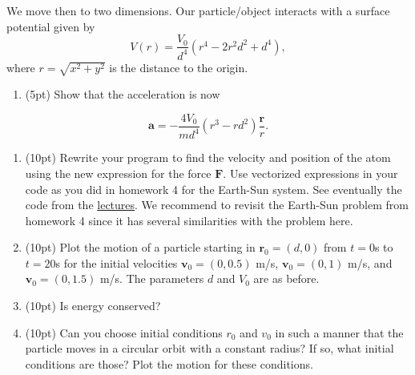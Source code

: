 \documentclass[%
oneside,                 %
final,                   %
10pt]{article}
\begin{document}
\noindent
We move then to two dimensions. Our particle/object interacts with a surface potential given by
\[
V(r)=\frac{V_0}{d^4}\left(r^4-2r^2d^2+d^4\right),
\]
where $r=\sqrt{x^2+y^2}$ is the distance to the origin.

\begin{enumerate}
\item (5pt) Show that the acceleration is now
\end{enumerate}

\noindent
\[
\bm{a}=-\frac{4V_0}{md^4}\left(r^3-rd^2\right)\frac{\bm{r}}{r}.
\]

\begin{enumerate}
\item (10pt) Rewrite your program to find the velocity and position of the atom using the new expression for the force $\bm{F}$. Use vectorized expressions in your code as you did in homework 4 for the Earth-Sun system. See eventually the code from the \href{{https://mhjensen.github.io/Physics321/doc/pub/energyconserv/html/energyconserv.html}}{lectures}.  We recommend to revisit the Earth-Sun problem from homework 4 since it has several similarities with the problem here.

\item (10pt) Plot the motion of a particle starting in $\bm{r}_0=(d,0)$ from $t=0$s to $t=20$s for the initial velocities $\bm{v}_0= (0,0.5)$ m/s, $\bm{v}_0= (0,1)$ m/s, and $\bm{v}_0= (0,1.5)$ m/s. The parameters $d$ and $V_0$ are as before.

\item (10pt) Is energy conserved? 

\item (10pt) Can you choose initial conditions $r_0$ and $v_0$ in such a manner that the particle moves in a circular orbit with a constant radius? If so, what initial conditions are those? Plot the motion for these conditions.
\end{enumerate}

\noindent

\end{document}
